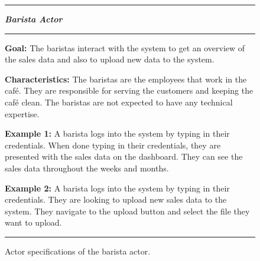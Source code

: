 \begin{figure}[H]
    \noindent
    \rule{\textwidth}{0.4pt}

    \begin{center}
    \noindent
    \textit{\textbf{Barista Actor}}
    \end{center}

    \noindent
    \rule{\textwidth}{0.4pt}
    \noindent

    \textbf{Goal:} The baristas interact with the system to get an overview of the sales data and also to upload
    new data to the system.
    \newline
    \noindent

    \textbf{Characteristics:} The baristas are the employees that work in the café.
    They are responsible for serving the customers and keeping the café clean.
    The baristas are not expected to have any technical expertise.
    \newline
    \noindent

    \textbf{Example 1:} A barista logs into the system by typing in their credentials.
    When done typing in their credentials, they are presented with the sales data on the dashboard.
    They can see the sales data throughout the weeks and months.
    \newline
    \noindent

    \textbf{Example 2:} A barista logs into the system by typing in their credentials.
    They are looking to upload new sales data to the system.
    They navigate to the upload button and select the file they want to upload.

    \noindent
    \rule{\textwidth}{0.04pt}
    \caption{Actor specifications of the barista actor.
    }\label{fig:actor-barista}
\end{figure}

